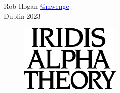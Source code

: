 Rob Hogan \href{https://mastodon.social/@mwenge}{\textcolor{blue}{@mwenge}}\\
Dublin 2023 \\

\clearpage
\vspace*{\fill}
\begin{figure}[H]
    \centering
      \includegraphics[width=5cm]{src/cover/title_page.png}%
\end{figure}
\vspace*{\fill}
\thispagestyle{empty}%
\clearpage

